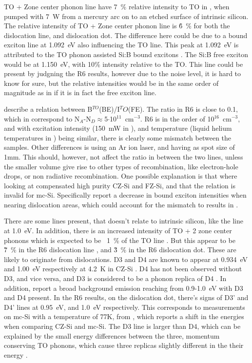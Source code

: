 TO + Zone center phonon line have 7~\% relative intensity to TO in \cite{dean67}, when pumped with 7~W from a mercury arc on to an etched surface of intrinsic silicon. The relative intensity of TO + Zone center phonon line is \~6~\% for both the dislocation line, and dislocation dot. The difference here could be due to a bound exciton line at 1.092~eV also influencing the TO line. This peak at 1.092~eV is attributed to the TO phonon assisted Si:B bound excitons \cite{sauer73}. The Si:B free exciton would be at 1.150~eV, with 10\% intensity relative to the TO. This line could be present by judgning the R6 results, however due to the noise level, it is hard to know for sure, but the relative intensities would be in the same order of magnitude as in \cite{sauer73} if it is in fact the free exciton line.


\cite{tajima78} describe a relation between B$^{TO}$(BE)/I$^TO$(FE). The ratio in R6 is close to 0.1, which in \cite{tajima78} correspond to N$_A$-N$_D\approx$5$\cdot$10$^{11}$~cm$^{-3}$. R6 is in the order of 10$^{16}$~cm$^{-3}$, and with excitation intensity (150~mW in \cite{tajima78}), and temperature (liquid helium temperatures in \cite{tajima78}) being similar, there is clearly some mismatch between the samples. Other differences is \cite{tajima78} using an Ar ion laser, and having as spot size of 1mm. This should, however, not affect the ratio in between the two lines, unless the smaller volume give rise to other types of recombination, like electron-hole drops, or non radiative recombination. One possible explanation is that \cite{tajima78} where looking at compensated high purity CZ-Si and FZ-Si, and that the relation is invalid for mc-Si. Specifically \cite{drozdov76} report a decrease in bound exciton intensities when nearing dislocation areas, which could account for the mismatch to results in \cite{tajima78}.



There are some lines present, that doesn't relate to intrinsic silicon, like the line at 1.0~eV. In addition, there is an increased intensity of TO + 2 zone center phonons which is expected to be ~1~\% of the TO line \cite{dean67}. But this appear to be \~7~\% in the R6 dislocation line , and \~3~\% in the R6 dislocation dot. These are likely to originate from dislocations. D3 and D4 are known to appear at 0.934~eV and 1.00~eV respectively at 4.2~K in CZ-Si \cite{drozdov76}. D4 has not been observed without D3, and vice versa, and D3 is considered to be a phonon replica of D4 \cite{kveder95}. In addition, \cite{tajima95} report a broad background emission reaching from 0.9-1.0~eV with D3 and D4 present. In the R6 results, on the dislocation dot, there's signs of D3' and D4' lines at 0.95~eV, and 1.0~eV respectively. This corresponds to measurements on mc-Si with a temperature of 77K, from \cite{tarasov00}, which reports a shift in the energies when comparing CZ-Si and mc-Si. The D3 line is larger than D4, which can be explained by the small energy differences between the three, momentum conserving TO phonons, which cause three replicas slightly different in the their energy \cite{arguirov07}.

